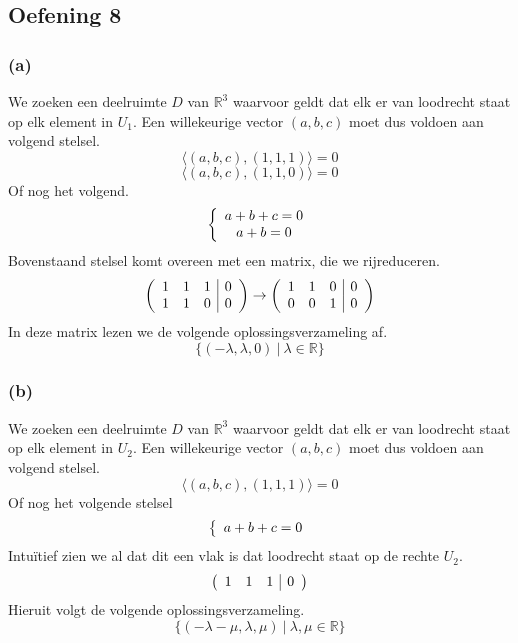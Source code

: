 \documentclass[lineaire_algebra_oplossingen.tex]{subfiles}
\begin{document}
\subsection{Oefening 8}
\subsubsection*{(a)}
We zoeken een deelruimte $D$ van $\mathbb{R}^3$ waarvoor geldt dat elk er van loodrecht staat op elk element in $U_1$. Een willekeurige vector $(a,b,c)$ moet dus voldoen aan volgend stelsel.
\[
\langle (a,b,c),(1,1,1)\rangle = 0
\]
\[
\langle (a,b,c),(1,1,0)\rangle = 0
\]
Of nog het volgend.
\[
\left\{
\begin{array}{c c}
a+b+c=0\\
a+b=0
\end{array}
\right.
\]
Bovenstaand stelsel komt overeen met een matrix, die we rijreduceren.
\[
\left(
\begin{array}{c c c  | c}
1&1&1&0\\
1&1&0&0
\end{array}
\right)
\rightarrow
\left(
\begin{array}{c c c  | c}
1&1&0&0\\
0&0&1&0
\end{array}
\right)
\]
In deze matrix lezen we de volgende oplossingsverzameling af.
\[
\{ (-\lambda,\lambda,0)\ |\ \lambda\in\mathbb{R}\}
\]


\subsubsection*{(b)}
We zoeken een deelruimte $D$ van $\mathbb{R}^3$ waarvoor geldt dat elk er van loodrecht staat op elk element in $U_2$. Een willekeurige vector $(a,b,c)$ moet dus voldoen aan volgend stelsel.
\[
\langle (a,b,c),(1,1,1)\rangle = 0
\]
Of nog het volgende stelsel
\[
\left\{
\begin{array}{c c}
a + b + c = 0 
\end{array}
\right.
\]
Intu\"itief zien we al dat dit een vlak is dat loodrecht staat op de rechte $U_2$.
\[
\left(
\begin{array}{c c c | c}
1 & 1 & 1 & 0 
\end{array}
\right)
\]
Hieruit volgt de volgende oplossingsverzameling.
\[
\{ (-\lambda - \mu , \lambda, \mu)\ |\ \lambda,\mu \in \mathbb{R}\}
\]
\end{document}
